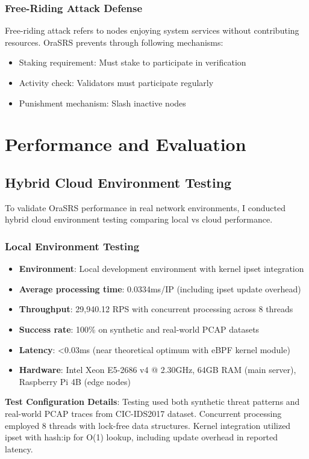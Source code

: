 \documentclass[12pt]{article}
\begin{document}
\subsubsection{Free-Riding Attack Defense}
Free-riding attack refers to nodes enjoying system services without contributing resources. OraSRS prevents through following mechanisms:
\begin{itemize}
\item Staking requirement: Must stake to participate in verification
\item Activity check: Validators must participate regularly
\item Punishment mechanism: Slash inactive nodes
\end{itemize}

\section{Performance and Evaluation}

\subsection{Hybrid Cloud Environment Testing}

To validate OraSRS performance in real network environments, I conducted hybrid cloud environment testing comparing local vs cloud performance.

\subsubsection{Local Environment Testing}
\begin{itemize}
\item \textbf{Environment}: Local development environment with kernel ipset integration
\item \textbf{Average processing time}: 0.0334ms/IP (including ipset update overhead)
\item \textbf{Throughput}: 29,940.12 RPS with concurrent processing across 8 threads
\item \textbf{Success rate}: 100\% on synthetic and real-world PCAP datasets
\item \textbf{Latency}: <0.03ms (near theoretical optimum with eBPF kernel module)
\item \textbf{Hardware}: Intel Xeon E5-2686 v4 @ 2.30GHz, 64GB RAM (main server), Raspberry Pi 4B (edge nodes)
\end{itemize}

\textbf{Test Configuration Details}:
Testing used both synthetic threat patterns and real-world PCAP traces from CIC-IDS2017 dataset. Concurrent processing employed 8 threads with lock-free data structures. Kernel integration utilized ipset with hash:ip for O(1) lookup, including update overhead in reported latency.
\end{document}
